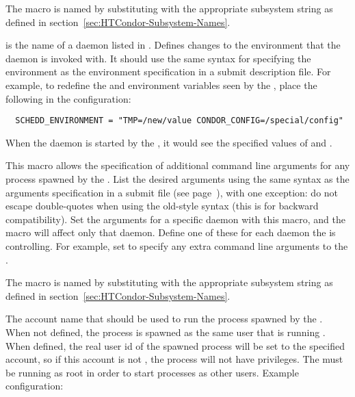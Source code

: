 \begin{description}
  The macro is named by substituting 
  with the appropriate subsystem string as defined in
  section~\ref{sec:HTCondor-Subsystem-Names}.

\label{param:DaemonNameEnvironment}
\item[\Macro{<DaemonName>\_ENVIRONMENT}]
   is the name of a daemon listed in
  .
  Defines changes to the environment that the daemon is invoked with.
  It should use the same syntax
  for specifying the environment as the environment specification in
  a submit description file.
  For example, to redefine the
   and  environment variables seen by the
  , place the following in the configuration:
  \footnotesize
\begin{verbatim}
  SCHEDD_ENVIRONMENT = "TMP=/new/value CONDOR_CONFIG=/special/config"
\end{verbatim}
  \normalsize
  When the  daemon is started by the , it would
  see the specified values of  and .

\label{param:SubsysArgs}
\item[\MacroB{<SUBSYS>\_ARGS}]
  This macro allows
  the specification of additional command line arguments for any
  process spawned by the .  List the desired arguments
  using the same syntax as the arguments specification in a
   submit file (see
  page~\pageref{man-condor-submit-arguments}), with one exception: do
  not escape double-quotes when using the old-style syntax (this is
  for backward compatibility).  Set the arguments for a specific
  daemon with this macro, and the macro will affect only that
  daemon. Define one of these for each daemon the  is
  controlling.  For example, set  to specify
  any extra command line arguments to the .

  The macro is named by substituting 
  with the appropriate subsystem string as defined in
  section~\ref{sec:HTCondor-Subsystem-Names}.

\label{param:SubsysUserid}
\item[\MacroB{<SUBSYS>\_USERID}]
  The account name that should be used to run the  process
  spawned by the .  When not defined, the process is
  spawned as the same user that is running .  When
  defined, the real user id of the spawned process will be set to the
  specified account, so if this account is not , the process will
  not have  privileges.  The  must be running as
  root in order to start processes as other users.  Example configuration:


\end{description}
